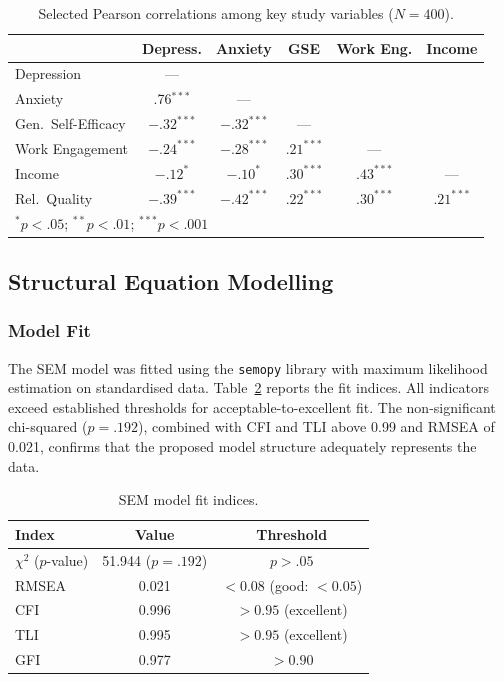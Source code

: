 \documentclass[12pt, a4paper]{article}
\begin{document}
\begin{table}[H]
\centering
\caption{Selected Pearson correlations among key study variables ($N = 400$).}
\label{tab:correlations}
\small
\begin{tabular}{lccccc}
\toprule
 & \textbf{Depress.} & \textbf{Anxiety} & \textbf{GSE} & \textbf{Work Eng.} & \textbf{Income} \\
\midrule
Depression          & ---       &          &        &          &        \\
Anxiety             & .76$^{***}$ & ---    &        &          &        \\
Gen.\ Self-Efficacy & $-.32^{***}$ & $-.32^{***}$ & --- &     &        \\
Work Engagement     & $-.24^{***}$ & $-.28^{***}$ & $.21^{***}$ & --- &   \\
Income              & $-.12^{*}$   & $-.10^{*}$   & $.30^{***}$ & $.43^{***}$ & --- \\
Rel.\ Quality       & $-.39^{***}$ & $-.42^{***}$ & $.22^{***}$ & $.30^{***}$ & $.21^{***}$ \\
\bottomrule
\multicolumn{6}{l}{\footnotesize $^*p < .05$; $^{**}p < .01$; $^{***}p < .001$}
\end{tabular}
\end{table}


\subsection{Structural Equation Modelling}

\subsubsection{Model Fit}

The SEM model was fitted using the \texttt{semopy} library with maximum likelihood estimation on standardised data. Table~\ref{tab:fit} reports the fit indices. All indicators exceed established thresholds for acceptable-to-excellent fit. The non-significant chi-squared ($p = .192$), combined with CFI and TLI above 0.99 and RMSEA of 0.021, confirms that the proposed model structure adequately represents the data.

\begin{table}[H]
\centering
\caption{SEM model fit indices.}
\label{tab:fit}
\small
\begin{tabular}{lcc}
\toprule
\textbf{Index} & \textbf{Value} & \textbf{Threshold} \\
\midrule
$\chi^2$ ($p$-value)  & 51.944 ($p = .192$) & $p > .05$ \\
RMSEA                  & 0.021               & $< 0.08$ (good: $< 0.05$) \\
CFI                    & 0.996               & $> 0.95$ (excellent) \\
TLI                    & 0.995               & $> 0.95$ (excellent) \\
GFI                    & 0.977               & $> 0.90$ \\
\bottomrule
\end{tabular}
\end{table}
\end{document}
